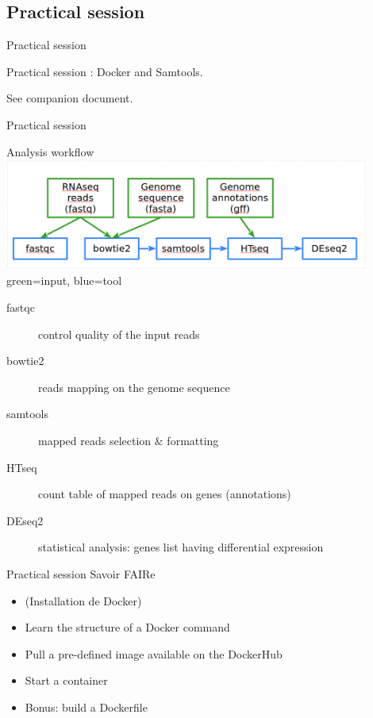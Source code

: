 \subsection{Practical session}

\begin{frame}{Practical session}

Practical session : Docker and Samtools.

See companion document.

\end{frame}

\begin{frame}{Practical session}
\begin{block}{Analysis workflow}
    \includegraphics[width=12cm]{01_introduction/images/FAIR_RNAseq_WF.png}\\
green=input, blue=tool
\end{block}
\footnotesize{
\begin{description}
    \item[fastqc] control quality of the input reads
    \item[bowtie2] reads mapping on the genome sequence
    \item[samtools] mapped reads selection $\&$ formatting
    \item[HTseq] count table of mapped reads on genes (annotations)
    \item[DEseq2] statistical analysis: genes list having differential expression
\end{description}
}
\end{frame}

\begin{frame}{Practical session}
Savoir FAIRe

\begin{itemize}
  \item (Installation de Docker)
  \item Learn the structure of a Docker command
  \item Pull a pre-defined image available on the DockerHub
  \item Start a container
  \item Bonus: build a Dockerfile
\end{itemize}
\end{frame}

